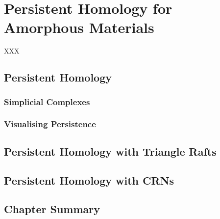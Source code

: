 \chapter{Persistent Homology for Amorphous Materials}
\label{ch:ph}

\begin{chapterabstract}
XXX
\end{chapterabstract}

\section{Persistent Homology}

\subsection{Simplicial Complexes}

\subsection{Visualising Persistence}

\section{Persistent Homology with Triangle Rafts}

\section{Persistent Homology with CRNs}

\section{Chapter Summary}